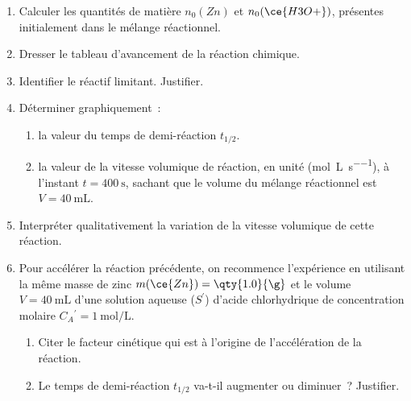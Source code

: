 \begin{enumerate}
    \item Calculer les quantités de matière $n_{0}(Zn)$ et $n_{0}(\ce{H3O+})$,
          présentes initialement dans le mélange réactionnel.
    \item Dresser le tableau d'avancement de la réaction chimique.
    \item Identifier le réactif limitant. Justifier.
    \item Déterminer graphiquement~:
          \begin{enumerate}
              \item la valeur du temps de demi-réaction $t_{1/2}$.
              \item la valeur de la vitesse volumique de réaction, en unité
                    (\unit{\mol\per\L\per\s}), à l'instant $t=\qty{400}{\s}$,
                    sachant que le volume du mélange réactionnel est
                    $V=\qty{40}{\mL}$.
          \end{enumerate}
    \item Interpréter qualitativement la variation de la vitesse volumique de
          cette réaction.
    \item Pour accélérer la réaction précédente, on recommence l'expérience en
          utilisant la même masse de zinc $m(\ce{Zn})=\qty{1.0}{\g}$ et le
          volume $V=\qty{40}{\mL}$
          d'une solution aqueuse ($S^{\prime}$) d'acide chlorhydrique de
          concentration molaire $C_{A}{ }^{\prime}=\qty{1}{\mol\per\L}$.
          \begin{enumerate}
              \item Citer le facteur cinétique qui est à l'origine de
                    l'accélération de la réaction.
              \item Le temps de demi-réaction $t_{1/2}$ va-t-il augmenter ou
                    diminuer~? Justifier.
          \end{enumerate}
\end{enumerate}


